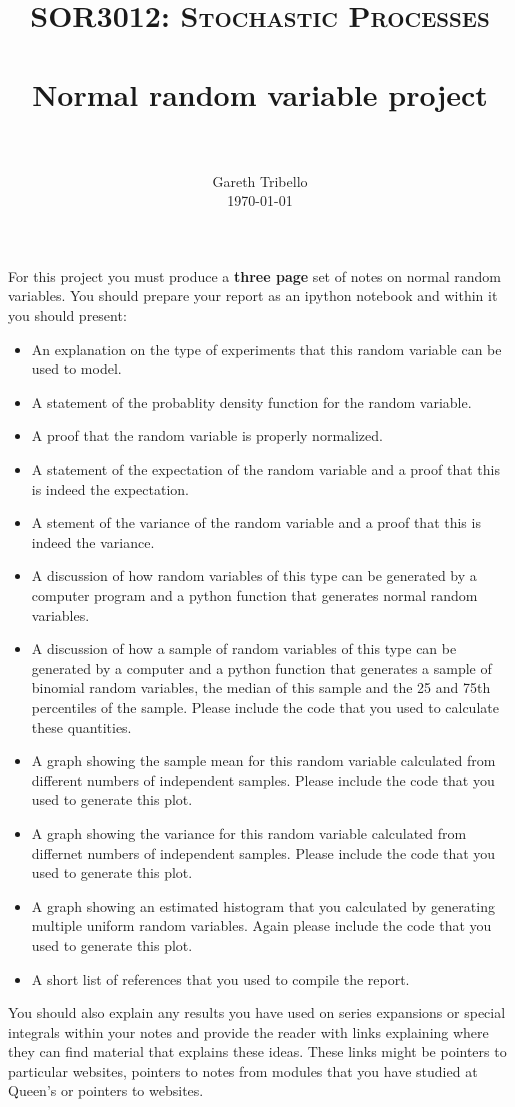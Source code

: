 \documentclass[paper=a4, fontsize=11pt]{scrartcl}
\title{\usefont{OT1}{bch}{b}{n} \normalfont \normalsize \textsc{SOR3012:
Stochastic Processes} \\ [25pt] \horrule{0.5pt} \\[0.4cm] 
\huge Normal random variable project \\
\horrule{2pt} \\[0.25cm]
}
\author{ \normalfont
\normalsize
        Gareth Tribello \\[-3pt] \normalsize
        \today
}
\date{}
\numberwithin{equation}{section}
\numberwithin{figure}{section}
\numberwithin{table}{section}
\begin{document}
\maketitle

For this project you must produce a {\bfseries three page} set of notes on normal random variables.  You should prepare your report as an ipython notebook and within it you should present:

\begin{itemize}
 \item An explanation on the type of experiments that this random variable can be used to model. 
 \item A statement of the probablity density function for the random variable.
 \item A proof that the random variable is properly normalized.
 \item A statement of the expectation of the random variable and a proof that this is indeed the expectation.
 \item A stement of the variance of the random variable and a proof that this is indeed the variance.
 \item A discussion of how random variables of this type can be generated by a computer program and a python function that generates normal random variables.
 \item A discussion of how a sample of random variables of this type can be generated by a computer and a python function that generates a sample of binomial random variables, the median of this sample and the 25 and 75th percentiles of the sample.  Please include the code that you used to calculate these quantities.
 \item A graph showing the sample mean for this random variable calculated from different numbers of independent samples.  Please include the code that you used to generate this plot.
 \item A graph showing the variance for this random variable calculated from differnet numbers of independent samples.  Please include the code that you used to generate this plot.
 \item A graph showing an estimated histogram that you calculated by generating multiple uniform random variables.  Again please include the code that you used to generate this plot.
 \item A short list of references that you used to compile the report.
\end{itemize}

You should also explain any results you have used on series expansions or special integrals within your notes and provide the reader with links explaining where they can find material that explains 
these ideas.  These links might be pointers to particular websites, pointers to notes from modules that you have studied at Queen's or pointers to websites.
\end{document}
